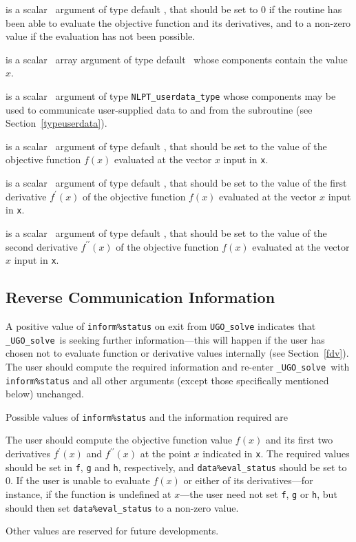 \documentclass{galahad}
\newcommand{\packagename}{UGO}
\newcommand{\fullpackagename}{\libraryname\_\packagename}
\newcommand{\solver}{{\tt \fullpackagename\_solve}}
\begin{document}
\begin{description}
 is a scalar \intentout\ argument of type default \integer,
that should be set to 0 if the routine has been able to evaluate
the objective function and its derivatives,
and to a non-zero value if the evaluation has not been possible.

 is a scalar \intentin\ array argument of type default \realdp\
whose components contain the value $x$.

 is a scalar \intentinout\ argument of type
{\tt NLPT\_userdata\_type} whose components may be used
to communicate user-supplied data to and from the
subroutine (see Section~\ref{typeuserdata}).

 is a scalar \intentout\ argument of type default \realdp,
that should be set to the value of the objective function $f(x)$
evaluated at the vector $x$ input in {\tt x}.

 is a scalar \intentout\ argument of type default \realdp,
that should be set to the value of the first derivative
$f^{\prime}(x)$ of the objective function $f(x)$
evaluated at the vector $x$ input in {\tt x}.

 is a scalar \intentout\ argument of type default \realdp,
that should be set to the value of the second derivative
$f^{\prime\prime}(x)$ of the objective function $f(x)$
evaluated at the vector $x$ input in {\tt x}.

\end{description}


\subsection{\label{reverse}Reverse Communication Information}

A positive value of {\tt inform\%status} on exit from
{\tt \packagename\_solve}
indicates that
\solver\ is seeking further information---this will happen
if the user has chosen not to evaluate function or
derivative values internally (see Section~\ref{fdv}).
The user should compute the required information and re-enter \solver\
with {\tt inform\%status} and all other arguments (except those specifically
mentioned below) unchanged.

Possible values of {\tt inform\%status} and the information required are
\begin{description}
\ittf{4.} The user should compute the objective function
     value $f(x)$ and its first two derivatives $f^{\prime}(x)$ and
     $f^{\prime\prime}(x)$ at the point $x$ indicated in {\tt x}.
     The required values should be set in {\tt f}, {\tt g} and {\tt h},
     respectively, and  {\tt data\%eval\_status} should be set to 0.
     If the user is unable to evaluate $f(x)$ or either of its
     derivatives---for instance, if the function is
     undefined at $x$---the user need not set {\tt f}, {\tt g} or {\tt h},
     but should then set {\tt data\%eval\_status} to a non-zero value.
\end{description}
Other values are reserved for future developments.
\end{document}
